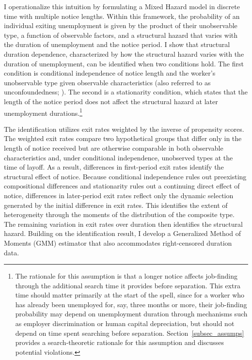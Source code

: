 \documentclass{div}
\begin{document}

I operationalize this intuition by formulating a Mixed Hazard model in discrete time with multiple notice lengths. Within this framework, the probability of an individual exiting unemployment is given by the product of their unobservable type, a function of observable factors, and a structural hazard that varies with the duration of unemployment and the notice period. I show that structural duration dependence, characterized by how the structural hazard varies with the duration of unemployment, can be identified when two conditions hold. The first condition is conditional independence of notice length and the worker's unobservable type given observable characteristics (also referred to as unconfoundedness; \cite{RosenbaumRubin1983}). The second is a stationarity condition, which states that the length of the notice period does not affect the structural hazard at later unemployment durations.\footnote{The rationale for this assumption is that a longer notice affects job-finding through the additional search time it provides before separation. This extra time should matter primarily at the start of the spell, since for a worker who has already been unemployed for, say, three months or more, their job-finding probability may depend on unemployment duration through mechanisms such as employer discrimination or human capital depreciation, but should not depend on time spent searching before separation. Section~\ref{subsec_assumps} provides a search-theoretic rationale for this assumption and discusses potential violations.} 

The identification utilizes exit rates weighted by the inverse of propensity scores. The weighted exit rates compare two hypothetical groups that differ only in the length of notice received but are otherwise comparable in both observable characteristics and, under conditional independence, unobserved types at the time of layoff. As a result, differences in first-period exit rates identify the structural effect of notice. Because conditional independence rules out preexisting compositional differences and stationarity rules out a continuing direct effect of notice, differences in later-period exit rates reflect only the dynamic selection generated by the initial difference in exit rates. This identifies the extent of heterogeneity through the moments of the distribution of the composite type. The remaining variation in exit rates over duration then identifies the structural hazard. Building on the identification result, I develop a Generalized Method of Moments (GMM) estimator that also accommodates right-censored duration data.
\end{document}
